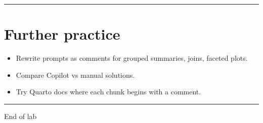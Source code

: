 \documentclass[
  letterpaper,
  DIV=11,
  numbers=noendperiod]{scrreprt}
\providecommand{\tightlist}{%
  \setlength{\itemsep}{0pt}\setlength{\parskip}{0pt}}
\begin{document}
\begin{center}\rule{0.5\linewidth}{0.5pt}\end{center}

\section{Further practice}\label{further-practice}

\begin{itemize}
\tightlist
\item
  Rewrite prompts as comments for grouped summaries, joins, faceted
  plots.
\item
  Compare Copilot vs manual solutions.
\item
  Try Quarto docs where each chunk begins with a comment.
\end{itemize}

\begin{center}\rule{0.5\linewidth}{0.5pt}\end{center}

End of lab
\end{document}

